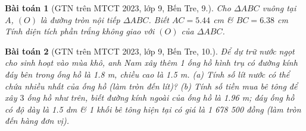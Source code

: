 \documentclass{article}
\newtheorem{baitoan}{Bài toán}
\begin{document}
\begin{baitoan}[GTN trên MTCT 2023, lớp 9, Bến Tre, 9.]
	Cho $\Delta ABC$ vuông tại $A$, $(O)$ là đường tròn nội tiếp $\Delta ABC$. Biết $AC = 5.44$ \emph{cm} \& $BC = 6.38$ \emph{cm} Tính diện tích phần trắng không giao với $(O)$ của $\Delta ABC$.
\end{baitoan}

\begin{baitoan}[GTN trên MTCT 2023, lớp 9, Bến Tre, 10.]
	Để dự trữ nước ngọt cho sinh hoạt vào mùa khô, anh Nam xây thêm 1 ống hồ hình trụ có đường kính đáy bên trong ống hồ là \emph{1.8 m}, chiều cao là \emph{1.5 m}. (a) Tính số lít nước có thể chứa nhiều nhất của ống hồ (làm tròn đến lít)? (b) Tính số tiền mua bê tông để xây $3$ ống hồ như trên, biết đường kính ngoài của ống hồ là \emph{1.96 m}; đáy ống hồ có độ dày là \emph{1.5 dm} \& 1 khối bê tông hiện tại có giá là \emph{1 678 500 đồng} (làm tròn đến hàng đơn vị).
\end{baitoan}


\printbibliography[heading=bibintoc]
	
\end{document}
